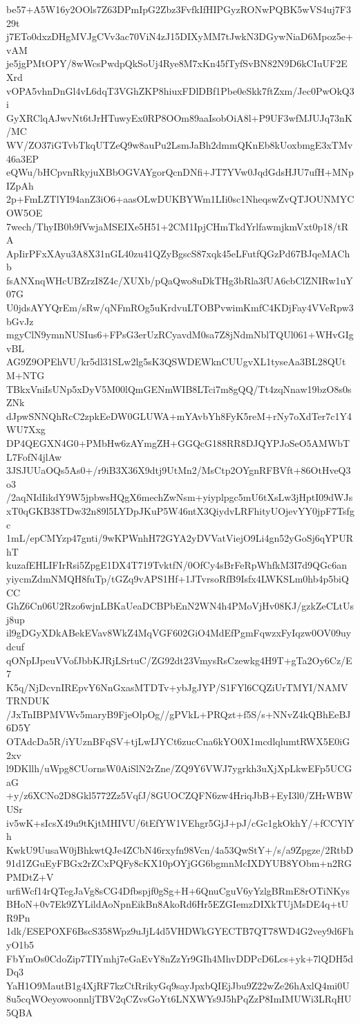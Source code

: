 be57+A5W16y2OOls7Z63DPmIpG2Zbz3FvfkIfHIPGyzRONwPQBK5wVS4uj7F329t
j7ETo0dxzDHgMVJgCVv3ac70ViN4zJ15DIXyMM7tJwkN3DGywNiaD6Mpoz5e+vAM
je5jgPMtOPY/8wWcsPwdpQkSoUj4Rye8M7xKn45fTyfSvBN82N9D6kCIuUF2EXrd
vOPA5vhnDnGl4vL6dqT3VGhZKP8hiuxFDlDBf1Pbe0eSkk7ftZxm/Jec0PwOkQ3i
GyXRClqAJwvNt6tJrHTuwyEx0RP8OOm89aaIsobOiA8l+P9UF3wfMJUJq73nK/MC
WV/ZO37iGTvbTkqUTZeQ9w8auPu2LsmJaBh2dmmQKnEb8kUoxbmgE3xTMv46a3EP
eQWu/bHCpvnRkyjuXBbOGVAYgorQcnDNfi+JT7YVw0JqdGdsHJU7ufH+MNpIZpAh
2p+FmLZTlYI94anZ3iO6+aasOLwDUKBYWm1LIi0sc1NheqswZvQTJOUNMYCOW5OE
7wech/ThyIB0b9fVwjaMSEIXe5H51+2CM1IpjCHmTkdYrlfawmjkmVxt0p18/tRA
ApIirPFxXAyu3A8X31nGL40zu41QZyBgscS87xqk45eLFutfQGzPd67BJqeMAChb
fsANXnqWHcUBZrzI8Z4c/XUXb/pQaQwo8uDkTHg3bRla3fUA6cbClZNIRw1uY07G
U0jdsAYYQrEm/sRw/qNFmROg5uKrdvuLTOBPvwimKmfC4KDjFay4VVeRpw3bGvJz
mgyClN9ymnNUSIus6+FPsG3erUzRCyavdM0sa7Z8jNdmNblTQUl061+WHvGIgvBL
AG9Z9OPEhVU/kr5dl31SLw2lg5sK3QSWDEWknCUUgvXL1tyseAa3BL28QUtM+NTG
TBkxVniIsUNp5xDyV5M00lQmGENmWIB8LTci7m8gQQ/Tt4zqNnaw19bzO8s0sZNk
dJpwSNNQhRcC2zpkEeDW0GLUWA+mYAvbYh8FyK5reM+rNy7oXdTer7c1Y4WU7Xxg
DP4QEGXN4G0+PMbHw6zAYmgZH+GGQcG188RR8DJQYPJoSeO5AMWbTL7FofN4jlAw
3JSJUUaOQs5As0+/r9iB3X36X9dtj9UtMn2/MsCtp2OYgnRFBVft+86OtHveQ3o3
/2aqNIdIikdY9W5jpbwsHQgX6mechZwNsm+yiyplpgc5mU6tXsLw3jHptI09dWJs
xT0qGKB38TDw32n89l5LYDpJKuP5W46ntX3QiydvLRFhityUOjevYY0jpF7Tsfgc
1mL/epCMYzp47gnti/9wKPWnhH72GYA2yDVVatViejO9Li4gn52yGoSj6qYPURhT
kuzafEHLIFIrRsi5ZpgE1DX4T719TvktfN/0OfCy4sBrFeRpWhfkM3I7d9QGc6an
yiycmZdmNMQH8fuTp/tGZq9vAPS1Hf+1JTvrsoRfB9Isfx4LWKSLm0hb4p5biQCC
GhZ6Cn06U2Rzo6wjnLBKaUeaDCBPbEnN2WN4h4PMoVjHv08KJ/gzkZeCLtUsj8up
il9gDGyXDkABekEVav8WkZ4MqVGF602GiO4MdEfPgmFqwzxFyIqzw0OV09uydcuf
qONpIJpeuVVofJbbKJRjLSrtuC/ZG92dt23VmysRsCzewkg4H9T+gTa2Oy6Cz/E7
K5q/NjDcvnIREpvY6NnGxasMTDTv+ybJgJYP/S1FYl6CQZiUrTMYI/NAMVTRNDUK
/JxTnIBPMVWv5maryB9FjeOlpOg//gPVkL+PRQzt+f5S/s+NNvZ4kQBhEeBJ6D5Y
OTAdcDa5R/iYUznBFqSV+tjLwIJYCt6zucCna6kYO0X1mcdlqlumtRWX5E0iG2xv
l9DKllh/uWpg8CUornsW0AiSlN2rZne/ZQ9Y6VWJ7ygrkh3uXjXpLkwEFp5UCGaG
+y/z6XCNo2D8Gkl5772Zz5VqfJ/8GUOCZQFN6zw4HriqJbB+EyI3l0/ZHrWBWUSr
iv5wK+sIcsX49u9tKjtMHIVU/6tEfYW1VEhgr5GjJ+pJ/cGc1gkOkhY/+fCCYlYh
KwkU9UusaW0jBhkwtQJe4ZCbN46rxyfn98Vcn/4a53QwStY+/s/a9Zpgze/2RtbD
91d1ZGuEyFBGx2rZCxPQFy8cKX10pOYjGG6bgmnMcIXDYUB8YObm+n2RGPMDtZ+V
urfiWcf14rQTegJaVg8sCG4Dfbspjf0gSg+H+6QnuCguV6yYzlgBRmE8rOTiNKys
BHoN+0v7Ek9ZYLildAoNpnEikBn8AkoRd6Hr5EZGIemzDIXkTUjMsDE4q+tUR9Pn
1dk/ESEPOXF6BscS358Wpz9uJjL4d5VHDWkGYECTB7QT78WD4G2vey9d6FhyO1b5
FbYmOs0CdoZip7TIYmhj7eGaEvY8nZzYr9GIh4MhvDDPcD6Lcs+yk+7lQDH5dDq3
YaH1O9MautB1g4XjRF7kzCtRrikyGq9sayJpxbQIEjJbu9Z22wZe26hAxlQ4mi0U
8u5cqWOeyowoonnljTBV2qCZvsGoYt6LNXWYs9J5hPqZzP8ImIMUWi3LRqHU5QBA
